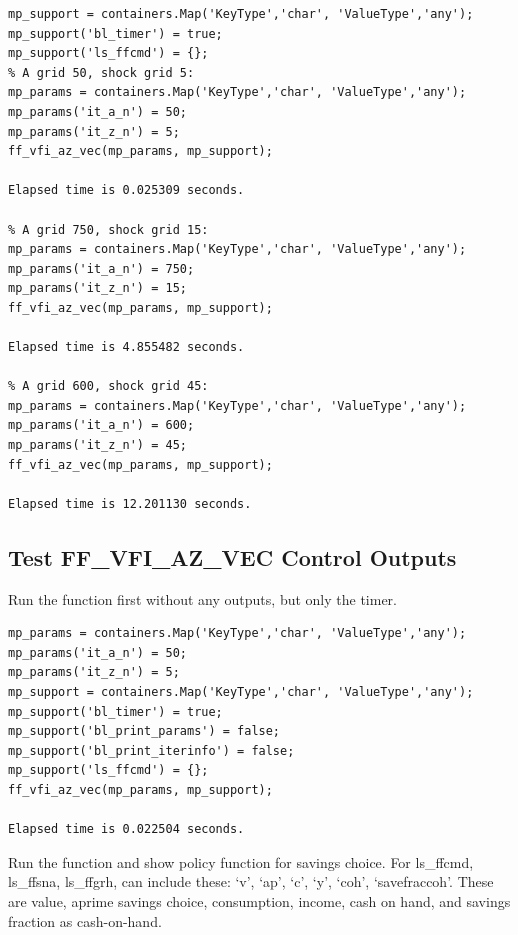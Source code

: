 \documentclass[
]{book}
\begin{document}
\begin{verbatim}
mp_support = containers.Map('KeyType','char', 'ValueType','any');
mp_support('bl_timer') = true;
mp_support('ls_ffcmd') = {};
% A grid 50, shock grid 5:
mp_params = containers.Map('KeyType','char', 'ValueType','any');
mp_params('it_a_n') = 50;
mp_params('it_z_n') = 5;
ff_vfi_az_vec(mp_params, mp_support);

Elapsed time is 0.025309 seconds.

% A grid 750, shock grid 15:
mp_params = containers.Map('KeyType','char', 'ValueType','any');
mp_params('it_a_n') = 750;
mp_params('it_z_n') = 15;
ff_vfi_az_vec(mp_params, mp_support);

Elapsed time is 4.855482 seconds.

% A grid 600, shock grid 45:
mp_params = containers.Map('KeyType','char', 'ValueType','any');
mp_params('it_a_n') = 600;
mp_params('it_z_n') = 45;
ff_vfi_az_vec(mp_params, mp_support);

Elapsed time is 12.201130 seconds.
\end{verbatim}

\hypertarget{test-ff_vfi_az_vec-control-outputs}{%
\subsection{Test FF\_VFI\_AZ\_VEC Control Outputs}\label{test-ff_vfi_az_vec-control-outputs}}

Run the function first without any outputs, but only the timer.

\begin{verbatim}
mp_params = containers.Map('KeyType','char', 'ValueType','any');
mp_params('it_a_n') = 50;
mp_params('it_z_n') = 5;
mp_support = containers.Map('KeyType','char', 'ValueType','any');
mp_support('bl_timer') = true;
mp_support('bl_print_params') = false;
mp_support('bl_print_iterinfo') = false;
mp_support('ls_ffcmd') = {};
ff_vfi_az_vec(mp_params, mp_support);

Elapsed time is 0.022504 seconds.
\end{verbatim}

Run the function and show policy function for savings choice. For
ls\_ffcmd, ls\_ffsna, ls\_ffgrh, can include these: `v', `ap', `c', `y',
`coh', `savefraccoh'. These are value, aprime savings choice,
consumption, income, cash on hand, and savings fraction as cash-on-hand.
\end{document}
